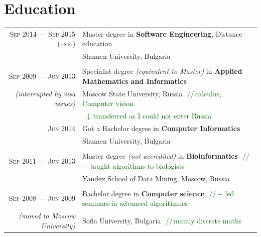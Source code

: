 \documentclass[a4paper,10pt]{article}
\def\myline{\color{linegray}\vline}
\newcommand{\minorcolor}[1]{\textcolor{mygray}{#1}}
\newcommand{\comment}[1]{\small\textcolor{darkgreen}{\,\,//\,#1}}
\newcommand{\mydate}[1]{\minorcolor{\textsc{#1}}}
\newcommand{\bracketcomment}[1]{{\small\textit{\minorcolor{(#1)}}}}
\begin{document}
\section{Education}
\hspace{-2mm}\begin{tabular}{r!{\myline}p{14cm}}
  \mydate{Sep 2014 --- Sep 2015 (exp.)}      &   Master degree in \textbf{Software Engineering}, Distance education\\
                                             &   Shumen University, Bulgaria\\


        \\
        \mydate{Sep 2009 --- Jun 2013}      &   Specialist degree \bracketcomment{equivalent to Master} in \textbf{Applied Mathematics and Informatics}\\
        \bracketcomment{interrupted by visa issues}
                                            &   Moscow State University, Russia \comment{calculus, Computer vision}\\
                                            &   \small\textcolor{darkgreen}{\,\,$\downarrow$\,transferred as I could not enter Russia}\\
        \mydate{Jun 2014}                   &   Got a Bachelor degree in \textbf{Computer Informatics}\\
                                            &   Shumen University, Bulgaria\\


        \\
        \mydate{Sep 2011 --- Jun 2013}      &   Master degree \bracketcomment{not accredited} in \textbf{Bioinformatics}
                                                \comment{+ taught algorithms to biologists}\\
                                            &   Yandex School of Data Mining, Moscow, Russia\\

        \\
        \mydate{Sep 2008 --- Jun 2009}      &   Bachelor degree in \textbf{Computer science}
                                                \comment{+ led seminars in advanced algorithmics}\\
        \bracketcomment{moved to Moscow University} &  Sofia University, Bulgaria \comment{mainly discrete maths}\\


\end{tabular}
\end{document}
